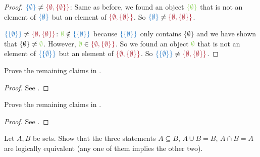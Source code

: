 \begin{proof}
\( \BLUE{\{ \emptyset \}} \neq \MAROON{\{ \emptyset, \{ \emptyset \} \}} \): Same as before, we found an object \(\GREEN{\{ \emptyset \}}\) that is not an element of \( \BLUE{\{\emptyset\}} \) but an element of \( \MAROON{\{\emptyset, \{ \emptyset \}\}} \). So \( \BLUE{\{ \emptyset \}} \neq \MAROON{\{\emptyset, \{ \emptyset \} \}} \).

\( \BLUE{\{ \{ \emptyset \} \}} \neq \MAROON{\{ \emptyset, \{ \emptyset \} \}} \): \( \GREEN{\emptyset} \notin \BLUE{\{ \{ \emptyset \} \}} \) because \( \BLUE{\{ \{ \emptyset \} \}} \) only contains \( \{ \emptyset \}\) and we have shown that \( \{ \emptyset \} \neq \GREEN{\emptyset} \). However, \( \GREEN{\emptyset} \in \MAROON{\{\emptyset, \{ \emptyset \} \}} \). So we found an object \(\GREEN{\emptyset}\) that is not an element of \( \BLUE{\{ \{ \emptyset\} \}} \) but an element of \( \MAROON{\{\emptyset, \{ \emptyset \}\}} \). So \( \BLUE{\{ \{ \emptyset \} \}} \neq \MAROON{\{\emptyset, \{ \emptyset \} \}} \).
\end{proof}

\begin{exercise}\label{exercise 3.1.3}
    Prove the remaining claims in .
\end{exercise}

\begin{proof}
    See .
\end{proof}

\begin{exercise}\label{exercise 3.1.4}
Prove the remaining claims in .
\end{exercise}

\begin{proof}
See .
\end{proof}

\begin{exercise}\label{exercise 3.1.5}
Let \(A, B\) be sets. Show that the three statements \(A \subseteq B\), \(A \cup B = B\), \(A \cap B = A\) are logically equivalent (any one of them implies the other two).
\end{exercise}

